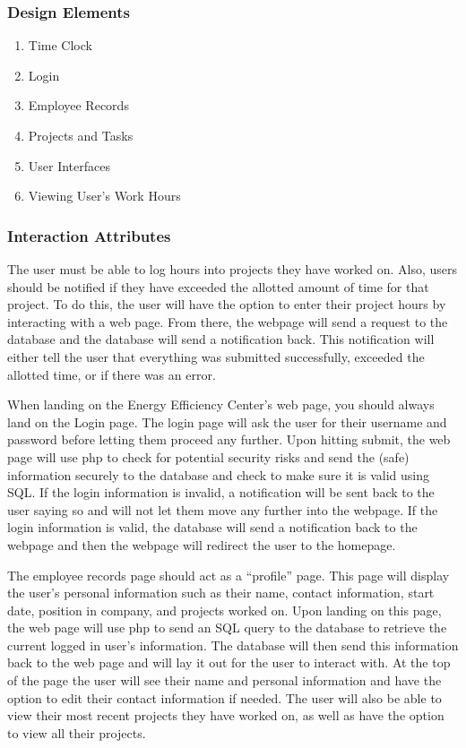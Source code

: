 \documentclass[letterpaper,10pt,titlepage,journal,compsoc,draftclsnofoot,onecolumn]{IEEEtran}
\newcommand\tab[1][1cm]{\hspace*{#1}}
\begin{document}
\subsubsection{Design Elements}

\begin{enumerate}

\item{Time Clock}
\item{Login}
\item{Employee Records}
\item{Projects and Tasks}
\item{User Interfaces}
\item{Viewing User's Work Hours}

\end{enumerate}

\subsubsection{Interaction Attributes}

\tab The user must be able to log hours into projects they have worked on. Also, users should be notified if they have exceeded the allotted amount of time for that project. To do this, the user will have the option to enter their project hours by interacting with a web page. From there, the webpage will send a request to the database and the database will send a notification back. This notification will either tell the user that everything was submitted successfully, exceeded the allotted time, or if there was an error.\newline


\tab When landing on the Energy Efficiency Center’s web page, you should always land on the Login page. The login page will ask the user for their username and password before letting them proceed any further. Upon hitting submit, the web page will use php to check for potential security risks and send the (safe) information securely to the database and check to make sure it is valid using SQL. If the login information is invalid, a notification will be sent back to the user saying so and will not let them move any further into the webpage. If the login information is valid, the database will send a notification back to the webpage and then the webpage will redirect the user to the homepage.\newline


\tab The employee records page should act as a “profile” page. This page will display the user’s personal information such as their name, contact information, start date, position in company, and projects worked on. Upon landing on this page, the web page will use php to send an SQL query to the database to retrieve the current logged in user’s information. The database will then send this information back to the web page and will lay it out for the user to interact with. At the top of the page the user will see their name and personal information and have the option to edit their contact information if needed. The user will also be able to view their most recent projects they have worked on, as well as have the option to view all their projects.  \newline
\end{document}
